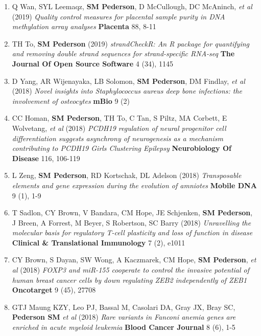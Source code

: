 \documentclass[11pt,a4paper,]{moderncv}
\begin{document}
\begin{enumerate}
     \item Q Wan, SYL Leemaqz, \textbf{SM Pederson}, D McCullough, DC McAninch, \emph{et al} (2019) \emph{Quality control measures for placental sample purity in DNA methylation array analyses} \textbf{Placenta} 88, 8-11 \\[-3mm] 
     \item TH To, \textbf{SM Pederson} (2019) \emph{strandCheckR: An R package for quantifying and removing double strand sequences for strand-specific RNA-seq} \textbf{The Journal Of Open Source Software} 4 (34), 1145 \\[-3mm] 
     \item D Yang, AR Wijenayaka, LB Solomon, \textbf{SM Pederson}, DM Findlay, \emph{et al} (2018) \emph{Novel insights into Staphylococcus aureus deep bone infections: the involvement of osteocytes} \textbf{mBio} 9 (2) \\[-3mm] 
     \item CC Homan, \textbf{SM Pederson}, TH To, C Tan, S Piltz, MA Corbett, E Wolvetang, \emph{et al} (2018) \emph{PCDH19 regulation of neural progenitor cell differentiation suggests asynchrony of neurogenesis as a mechanism contributing to PCDH19 Girls Clustering Epilepsy} \textbf{Neurobiology Of Disease} 116, 106-119 \\[-3mm] 
     \item L Zeng, \textbf{SM Pederson}, RD Kortschak, DL Adelson (2018) \emph{Transposable elements and gene expression during the evolution of amniotes} \textbf{Mobile DNA} 9 (1), 1-9 \\[-3mm] 
     \item T Sadlon, CY Brown, V Bandara, CM Hope, JE Schjenken, \textbf{SM Pederson}, J Breen, A Forrest, M Beyer, S Robertson, SC Barry (2018) \emph{Unravelling the molecular basis for regulatory T-cell plasticity and loss of function in disease} \textbf{Clinical \& Translational Immunology} 7 (2), e1011 \\[-3mm] 
     \item CY Brown, S Dayan, SW Wong, A Kaczmarek, CM Hope, \textbf{SM Pederson}, \emph{et al} (2018) \emph{FOXP3 and miR-155 cooperate to control the invasive potential of human breast cancer cells by down regulating ZEB2 independently of ZEB1} \textbf{Oncotarget} 9 (45), 27708 \\[-3mm] 
     \item GTJ Maung KZY, Leo PJ, Bassal M, Casolari DA, Gray JX, Bray SC, \textbf{Pederson SM} \emph{et al} (2018) \emph{Rare variants in Fanconi anemia genes are enriched in acute myeloid leukemia} \textbf{Blood Cancer Journal} 8 (6), 1-5 \\[-3mm] 

\end{enumerate}
\end{document}

